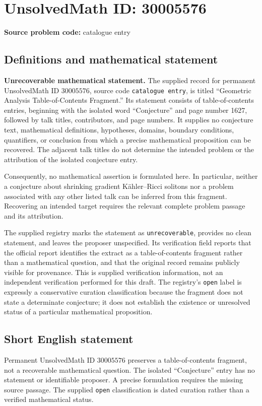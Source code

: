 \documentclass[11pt]{article}
\begin{document}
\section*{UnsolvedMath ID: 30005576}
\textbf{Source problem code:} catalogue entry
\subsection{Definitions and mathematical statement}
\textbf{Unrecoverable mathematical statement.} The supplied record for permanent UnsolvedMath ID \(30005576\), source code \texttt{catalogue entry}, is titled ``Geometric Analysis Table-of-Contents Fragment.'' Its statement consists of table-of-contents entries, beginning with the isolated word ``Conjecture'' and page number 1627, followed by talk titles, contributors, and page numbers. It supplies no conjecture text, mathematical definitions, hypotheses, domains, boundary conditions, quantifiers, or conclusion from which a precise mathematical proposition can be recovered. The adjacent talk titles do not determine the intended problem or the attribution of the isolated conjecture entry.

Consequently, no mathematical assertion is formulated here. In particular, neither a conjecture about shrinking gradient Kähler--Ricci solitons nor a problem associated with any other listed talk can be inferred from this fragment. Recovering an intended target requires the relevant complete problem passage and its attribution.

The supplied registry marks the statement as \texttt{unrecoverable}, provides no clean statement, and leaves the proposer unspecified. Its verification field reports that the official report identifies the extract as a table-of-contents fragment rather than a mathematical question, and that the original record remains publicly visible for provenance. This is supplied verification information, not an independent verification performed for this draft. The registry's \texttt{open} label is expressly a conservative curation classification because the fragment does not state a determinate conjecture; it does not establish the existence or unresolved status of a particular mathematical proposition.
\subsection{Short English statement}
Permanent UnsolvedMath ID \(30005576\) preserves a table-of-contents fragment, not a recoverable mathematical question. The isolated ``Conjecture'' entry has no statement or identifiable proposer. A precise formulation requires the missing source passage. The supplied \texttt{open} classification is dated curation rather than a verified mathematical status.
\end{document}

